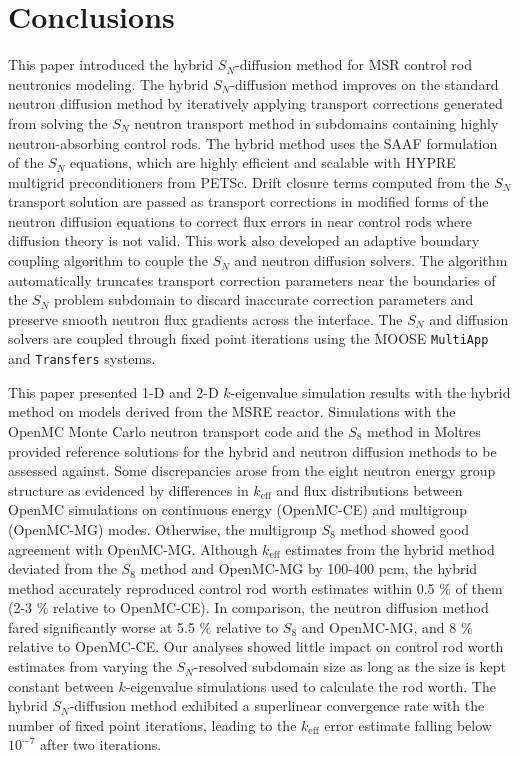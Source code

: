 \section{Conclusions} \label{sec:conclusion}

This paper introduced the hybrid $S_N$-diffusion method for \gls{MSR} control rod neutronics
modeling. The hybrid $S_N$-diffusion method improves on the standard neutron diffusion method by
iteratively applying transport corrections generated from solving the $S_N$ neutron transport
method in subdomains containing highly neutron-absorbing control rods. The hybrid method uses the
\gls{SAAF} formulation of the $S_N$ equations, which are highly efficient and
scalable with HYPRE multigrid preconditioners \cite{hypre_hypre_2022} from PETSc.
Drift closure terms computed from the $S_N$ transport solution are passed as transport corrections
in modified forms of the neutron diffusion equations to correct flux errors in near control rods
where diffusion theory is not valid. This work also developed
an adaptive boundary coupling algorithm to couple the $S_N$ and neutron diffusion solvers. The
algorithm automatically truncates transport correction parameters near the boundaries of the
$S_N$ problem subdomain to discard inaccurate correction parameters and preserve smooth neutron
flux gradients across the interface. The $S_N$ and diffusion solvers are coupled through fixed
point iterations using the \gls{MOOSE} \texttt{MultiApp} and \texttt{Transfers} systems.

This paper presented 1-D and 2-D $k$-eigenvalue simulation results with the hybrid method on
models derived from the \gls{MSRE} reactor.
Simulations with the OpenMC Monte Carlo neutron
transport code and the $S_8$ method in Moltres provided reference solutions for the hybrid and
neutron diffusion methods to be assessed against. Some discrepancies arose from the eight neutron
energy group structure as evidenced by differences in $k_\text{eff}$ and flux distributions between
OpenMC simulations on continuous energy (OpenMC-CE) and multigroup (OpenMC-MG) modes. Otherwise,
the multigroup $S_8$ method showed good agreement with OpenMC-MG. Although $k_\text{eff}$ estimates
from the hybrid method deviated from the $S_8$ method and OpenMC-MG by 100-400 pcm, the hybrid
method accurately reproduced control rod worth estimates within 0.5 \% of them (2-3 \% relative to
OpenMC-CE). In comparison, the neutron diffusion method fared significantly worse at 5.5 \%
relative to $S_8$ and OpenMC-MG, and 8 \% relative to OpenMC-CE. Our analyses showed little impact
on control rod worth estimates from varying the $S_N$-resolved subdomain size as long as the size
is kept constant between $k$-eigenvalue simulations used to calculate the rod worth. The hybrid
$S_N$-diffusion method exhibited a superlinear convergence rate with the number of fixed point
iterations, leading to the $k_\text{eff}$ error estimate falling below $10^{-7}$ after two
iterations.


